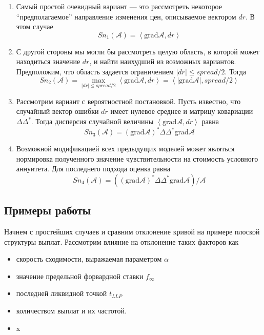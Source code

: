 \documentclass[10pt]{article}
\theoremstyle{definition}
\theoremstyle{remark}
\theoremstyle{plain}
\newcommand{\w}{f_\infty}
\newcommand{\scalar}[2]{\left<#1,#2\right>}
\begin{document}
\begin{enumerate}

\item Самый простой очевидный вариант --- это рассмотреть некоторое ``предполагаемое'' направление изменения цен, описываемое вектором $dr$. В этом случае
$$
Sn_1(\mathcal{A}) = \scalar{\mathrm{grad}\mathcal{A}}{dr}
$$

\item  С другой стороны мы могли бы рассмотреть целую область, в которой может находиться значение $dr$, и найти наихудший из возможных вариантов. Предположим, что область задается ограничением $|dr|\leqslant spread/2$. Тогда 
$$
Sn_2(\mathcal{A}) = \max\limits_{|dr|\leqslant spread/2}\scalar{\mathrm{grad}\mathcal{A}}{dr} = \scalar{|\mathrm{grad}\mathcal{A}|}{spread/2}
$$

\item Рассмотрим вариант с вероятностной постановкой. Пусть известно, что случайный вектор ошибки $dr$ имеет нулевое среднее и матрицу ковариации $\Delta\Delta^*$. Тогда дисперсия случайной величины $\scalar{\mathrm{grad}\mathcal{A}}{dr}$ равна
$$
Sn_3(\mathcal{A}) = (\mathrm{grad}\mathcal{A})^*\Delta\Delta^*\mathrm{grad}\mathcal{A}
$$
\item Возможной модификацией всех предыдущих моделей может являться нормировка полученного значение чувствительности на стоимость условного аннуитета. Для последнего подхода оценка равна
$$
Sn_4(\mathcal{A}) = \left((\mathrm{grad}\mathcal{A})^*\Delta\Delta^*\mathrm{grad}\mathcal{A}\right) / \mathcal{A}
$$
\end{enumerate}

\subsection{Примеры работы}
Начнем с простейших случаев и сравним отклонение кривой на примере плоской структуры выплат. Рассмотрим влияние на отклонение таких факторов как
\begin{itemize}
\item скорость сходимости, выражаемая параметром $\alpha$
\item значение предельной форвардной ставки $\w$
\item последней ликвидной точкой $t_{LLP}$
\item количеством выплат и их частотой.
\item x
\end{itemize}
\end{document}

